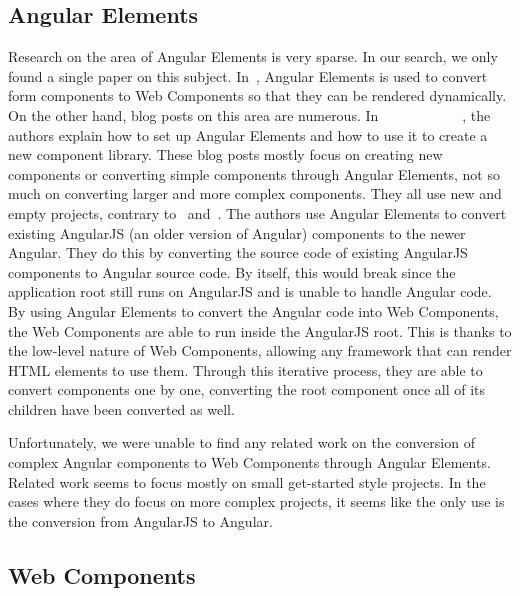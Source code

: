 \subsection{Angular Elements}
Research on the area of Angular Elements is very sparse. In our search, we only found a single paper on this subject. In~\cite{armengol2020development}, Angular Elements is used to convert form components to Web Components so that they can be rendered dynamically. On the other hand, blog posts on this area are numerous. In~\cite{basal_2019}~\cite{kitson_2019}~\cite{mackey-paulsen_2020}~\cite{nalepa_2020}~\cite{notiz.dev_2020}~\cite{sonara_2020}~\cite{strumpflohner_2019}~\cite{studio_la_cosa_nostra_2020}~\cite{s_2019}~\cite{techiediaries_team_2020}~\cite{vardanyan_2020}~\cite{williams_2020}, the authors explain how to set up Angular Elements and how to use it to create a new component library. These blog posts mostly focus on creating new components or converting simple components through Angular Elements, not so much on converting larger and more complex components. They all use new and empty projects, contrary to~\cite{helgevold_2019} and~\cite{seaman_2019}. The authors use Angular Elements to convert existing AngularJS (an older version of Angular) components to the newer Angular. They do this by converting the source code of existing AngularJS components to Angular source code. By itself, this would break since the application root still runs on AngularJS and is unable to handle Angular code. By using Angular Elements to convert the Angular code into Web Components, the Web Components are able to run inside the AngularJS root. This is thanks to the low-level nature of Web Components, allowing any framework that can render HTML elements to use them. Through this iterative process, they are able to convert components one by one, converting the root component once all of its children have been converted as well.

Unfortunately, we were unable to find any related work on the conversion of complex Angular components to Web Components through Angular Elements. Related work seems to focus mostly on small get-started style projects. In the cases where they do focus on more complex projects, it seems like the only use is the conversion from AngularJS to Angular.

\subsection{Web Components}

